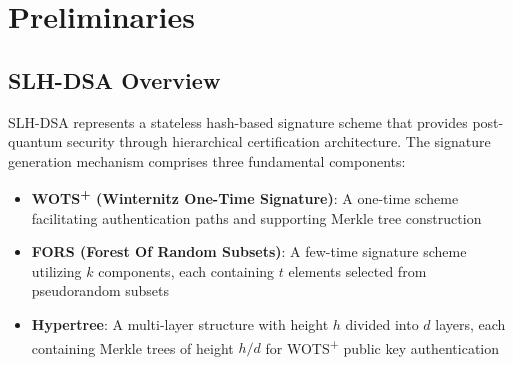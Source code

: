 \documentclass[journal]{IEEEtran}
\begin{document}
\section{Preliminaries}\label{sec:preliminaries}

\subsection{SLH-DSA Overview}

SLH-DSA represents a stateless hash-based signature scheme that provides post-quantum security through hierarchical certification architecture. The signature generation mechanism comprises three fundamental components:

\begin{itemize}
  \item \textbf{WOTS\textsuperscript{+} (Winternitz One-Time Signature)}: A one-time scheme facilitating authentication paths and supporting Merkle tree construction
  \item \textbf{FORS (Forest Of Random Subsets)}: A few-time signature scheme utilizing $k$ components, each containing $t$ elements selected from pseudorandom subsets
  \item \textbf{Hypertree}: A multi-layer structure with height $h$ divided into $d$ layers, each containing Merkle trees of height $h/d$ for WOTS\textsuperscript{+} public key authentication
\end{itemize}
\end{document}
